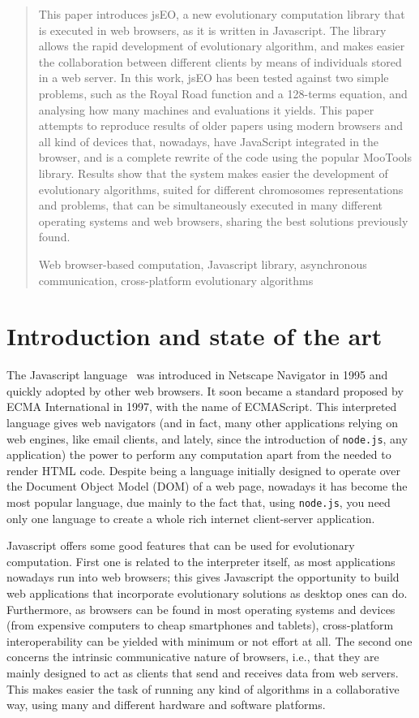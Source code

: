 \documentclass[runningheads,a4paper]{llncs}
\newcommand{\keywords}[1]{\par\addvspace\baselineskip
\noindent\keywordname\enspace\ignorespaces#1}
\begin{document}
\begin{abstract}
This paper introduces jsEO, a new evolutionary computation library that is executed in web browsers, as it is written in Javascript. The library allows the rapid development of evolutionary algorithm, and makes easier the collaboration between different clients by means of individuals stored in a web server. In this work, jsEO has been tested against two simple problems, such as the Royal Road function and a 128-terms equation, and analysing how many machines and evaluations it yields. 
This paper attempts to reproduce results of older papers using modern browsers and all kind of devices that, nowadays, have JavaScript integrated in the browser, and is a complete rewrite of the code using the popular MooTools library. 
Results show that the system makes easier 
 the development of evolutionary algorithms, suited for different chromosomes representations and problems, that can be simultaneously executed in many different operating systems and web browsers, sharing the best solutions previously found.
\keywords{Web browser-based computation, Javascript library, asynchronous communication, cross-platform evolutionary algorithms}
\end{abstract}


\section{Introduction and state of the art}
\label{sec:intro}
The Javascript language~\cite{javascript} was introduced in Netscape
Navigator in 1995 and quickly adopted by other web browsers. It soon
became a standard proposed by ECMA International in 1997, with the
name of ECMAScript. This interpreted language gives web navigators
(and in fact, many other applications relying on web engines, like
email clients, and lately, since the introduction of {\tt node.js},
any application) the power to perform any computation apart from the
needed to render HTML code. Despite being a language initially
designed to operate over the Document Object Model (DOM) of a web
page, nowadays it has become the most popular language, due mainly to
the fact that, using {\tt node.js}, you need only one language to
create a whole rich internet client-server application.

Javascript offers some good features that can be used for evolutionary computation. First one is related to the interpreter itself, as most applications nowadays run into web browsers; this gives Javascript the opportunity to build web applications that incorporate evolutionary solutions as desktop ones can do. Furthermore, as browsers can be found in most operating systems and devices (from expensive computers to cheap smartphones and tablets), cross-platform interoperability can be yielded with minimum or not effort at all. The second one concerns the intrinsic communicative nature of browsers, i.e., that they are mainly designed to act as clients that send and receives data from web servers. This makes easier the task of running any kind of algorithms in a collaborative way, using many and different hardware and software platforms. 
\end{document}
